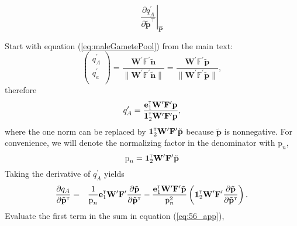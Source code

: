 \documentclass[11pt]{article}
\def\mbf#1{\mathbf{#1}}
\def\mbb#1{\mathbb{#1}}
\newcommand{\bo}[1]{{\bf #1}}
\newcommand{\tr}{{\mbox{\tiny \sf T}}}
\begin{document}
\begin{equation}
	\left. \frac{\partial q^{\prime}_{A}}{\partial \tilde{\mbf{p}}^{\intercal}} \right|_{\hat{\mbf{P}}}
\end{equation}




 Start with equation (\ref{eq:maleGametePool}) from the main text:
\begin{equation} \label{eq:maleGametePool_app}
	\left(
		\begin{array}{c}
			q^{\prime}_{A} \\
			q^{\prime}_{a} \\
		\end{array} \right) = 
			\frac{\mbf{W}^{\prime} \mbb{F}^{\prime} \tilde{\mbf{n}}}{\| \mbf{W}^{\prime} \mbb{F}^{\prime} \tilde{\mbf{n}} \|} = 
				\frac{\mbf{W}^{\prime} \mbb{F}^{\prime} \tilde{\mbf{p}}}{\| \mbf{W}^{\prime} \mbb{F}^{\prime} \tilde{\mbf{p}}\|},
\end{equation}
therefore
\begin{equation}
  q^\prime_A=\frac{\mathbf{e}_1^\tr \mathbf{W}^\prime \mathbf{F}^\prime  \mathbf{p}}{\mathbf{1}^\tr_{2}\mathbf{W}^\prime\mathbf{F}^\prime\mathbf{p}}, \label{eq:male_gamete_pool}
\end{equation}
 where the one norm can be replaced by $\mathbf{1}^\tr_{2}\mathbf{W}^\prime\mathbf{F}^\prime \tilde{\mbf{p}}$ because $\tilde{\mbf{p}}$ is nonnegative. For convenience, we will denote the normalizing factor in the denominator with $ \mbox{p}_{n}$, 
 \begin{equation}
   \mbox{p}_{n}=\mathbf{1}^\tr_{2}\mathbf{W}^\prime\mathbf{F}^\prime \tilde{\mbf{p}}
 \end{equation}
 Taking the derivative of $ q^\prime_A$ yields
\begin{eqnarray}
  \frac{\partial   q_A }{\partial \tilde{\bo p}^\tr}&=& \frac{1}{ \mbox{p}_{n}}\mathbf{e}_1^\tr \mathbf{W}^\prime \mathbf{F}^\prime   \frac{\partial  \tilde{\mbf{p}}}{\partial \tilde{\bo p}^\tr} - \frac{\mathbf{e}_1^\tr \mathbf{W}^\prime \mathbf{F}^\prime \tilde{\mbf{p}}}{ \mbox{p}_{n}^2} \left( \mathbf{1}^\tr_{2}\mathbf{W}^\prime\mathbf{F}^\prime \frac{\partial  \tilde{\mbf{p}}}{\partial \tilde{\bo p}^\tr} \right). \label{eq:56_app}
\end{eqnarray}
Evaluate the first term in the sum in equation (\ref{eq:56_app}),
\end{document}
